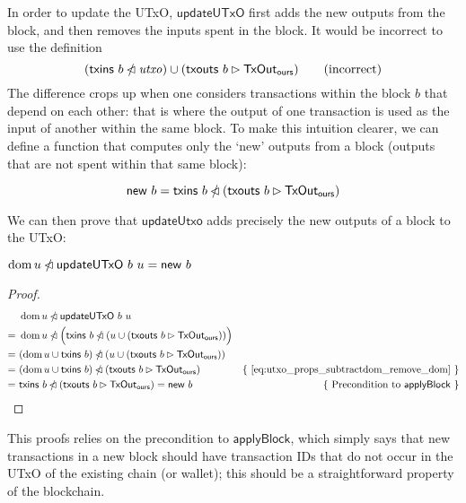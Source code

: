\documentclass{article}
\newcommand{\restrictdom}{\lhd}
\newcommand{\subtractdom}{\mathbin{\slashed{\restrictdom}}}
\newcommand{\restrictrange}{\rhd}
\DeclareMathOperator{\dom}{dom}
\theoremstyle{definition}{
  \newtheorem{lemma}{Lemma}[section] %
  \newtheorem{definition}[lemma]{Definition}
}
\theoremstyle{theorem}{
  \newtheorem{invariant}[lemma]{Invariant}
  \newtheorem{proofobligation}[lemma]{Proof Obligation}
}
\numberwithin{equation}{lemma}
\begin{document}
In order to update the UTxO, $\mathsf{updateUTxO}$ first adds the new outputs
from the block, and then removes the inputs spent in the block. It would be
incorrect to use the definition
%
\begin{equation*}
(\mathsf{txins} ~ b \subtractdom \mathit{utxo})  \cup (\mathsf{txouts} ~ b \restrictrange \mathsf{TxOut_{ours}})
\tag{incorrect}
\end{equation*}
%
The difference crops up when one considers transactions within the block $b$
that depend on each other: that is where the output of one transaction is used
as the input of another within the same block. To make this intuition clearer,
we can define a function that computes only the `new' outputs from a block
(outputs that are not spent within that same block):
%
\begin{definition}
\begin{equation*}
\mathsf{new} ~ b = \mathsf{txins} ~ b \subtractdom (\mathsf{txouts} ~ b \restrictrange \mathsf{TxOut_{ours}})
\end{equation*}
\end{definition}
%
We can then prove that $\mathsf{updateUtxo}$ adds precisely the new outputs
of a block to the UTxO:
%
\begin{lemma} \label{lem:update_remove_dom}
\begin{math}
\dom u \subtractdom \mathsf{updateUTxO} ~ b ~ u  = \mathsf{new} ~ b
\end{math}
\end{lemma}
%
\begin{proof}
\begin{align*}
  & ~ \dom u \subtractdom \mathsf{updateUTxO} ~ b ~ u \\
= & ~ \dom u \subtractdom \Bigl( \mathsf{txins} ~ b \subtractdom (u \cup (\mathsf{txouts} ~ b \restrictrange \mathsf{TxOut_{ours}})) \Bigr) \\
= & ~ (\dom u \cup \mathsf{txins} ~ b) \subtractdom (u \cup (\mathsf{txouts} ~ b \restrictrange \mathsf{TxOut_{ours}})) \\
= & ~ (\dom u \cup \mathsf{txins} ~ b) \subtractdom (\mathsf{txouts} ~ b \restrictrange \mathsf{TxOut_{ours}}) & \text{\{ \eqref{eq:utxo_props_subtractdom_remove_dom} \}} \\
= & ~ \mathsf{txins} ~ b \subtractdom (\mathsf{txouts} ~ b \restrictrange \mathsf{TxOut_{ours}}) = \mathsf{new} ~ b & \text{\{ Precondition to $\mathsf{applyBlock}$ \}}
\end{align*}
\end{proof}
%
This proofs relies on the precondition to $\mathsf{applyBlock}$, which simply
says that new transactions in a new block should have transaction IDs that do
not occur in the UTxO of the existing chain (or wallet); this should be a
straightforward property of the blockchain.
\end{document}
